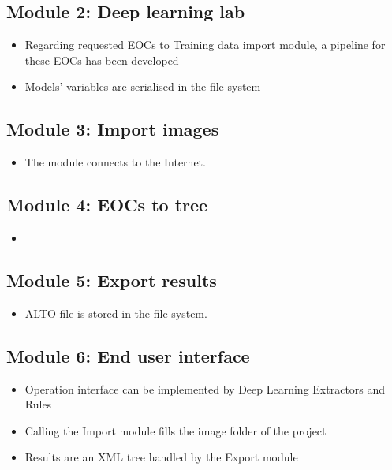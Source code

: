 \documentclass{polytech/polytech}
\numberwithin{figure}{chapter}
\begin{document}
\begin{appendix}
\subsection{Module 2: Deep learning lab}

\begin{itemize}
\item Regarding requested EOCs to Training data import module, a pipeline for these EOCs has been developed
\item Models’ variables are serialised in the file system
\end{itemize}

\subsection{Module 3: Import images}

\begin{itemize}
\item The module connects to the Internet.
\end{itemize}

\subsection{Module 4: EOCs to tree}

\begin{itemize}
\item 
\end{itemize}

\subsection{Module 5: Export results}

\begin{itemize}
\item ALTO file is stored in the file system.
\end{itemize}

\subsection{Module 6: End user interface}

\begin{itemize}
\item Operation interface can be implemented by Deep Learning Extractors and Rules
\item Calling the Import module fills the image folder of the project
\item Results are an XML tree handled by the Export module
\end{itemize}




\end{appendix}
\end{document}
